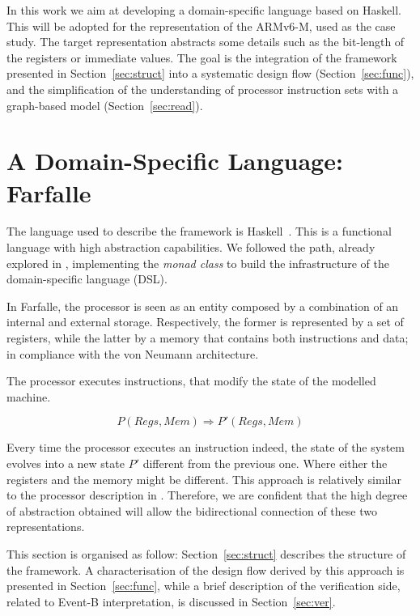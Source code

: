 \documentclass[conference]{IEEEtran}
\begin{document}
In this work we aim at developing a domain-specific language based on Haskell. This will be
adopted for the representation of the ARMv6-M, used as the case study. The target
representation abstracts some details such as the bit-length of the registers or immediate
values. The goal is the integration of the framework presented in Section~\ref{sec:struct}
into a systematic design flow (Section~\ref{sec:func}), and the simplification of the understanding of
processor instruction sets with a graph-based model (Section~\ref{sec:read}).


\section{A Domain-Specific Language: Farfalle}
\label{sec:dsl}
The language used to describe the framework is Haskell~\cite{haskell}. This is a 
functional language with high abstraction capabilities.
We followed the path, already explored in \cite{armv7}, implementing the \textit{monad class}
to build the infrastructure of the domain-specific language (DSL).

In Farfalle, the processor is seen as an entity composed by a combination of an internal and
external storage. Respectively, the former is represented by a set of registers,
while the latter by a memory that contains both instructions and data; in compliance with the
von Neumann architecture. 

The processor executes instructions, that modify the state of the modelled machine.

$$P(Regs, Mem) \Rightarrow P'(Regs, Mem)$$

\noindent Every time the processor executes an instruction indeed, the state of the system
evolves into a new state $P'$ different from the previous one. Where either the registers and
the memory might be different. This approach is relatively similar to the processor
description in \cite{isaFunc}. Therefore, we are confident that the high degree of
abstraction obtained will allow the bidirectional connection of these two representations.

This section is organised as follow: Section~\ref{sec:struct} describes the structure of the
framework. A characterisation of the design flow derived by this approach is presented in
Section~\ref{sec:func}, while a brief description of the verification side, related to Event-B
interpretation, is discussed in Section~\ref{sec:ver}.
\end{document}
